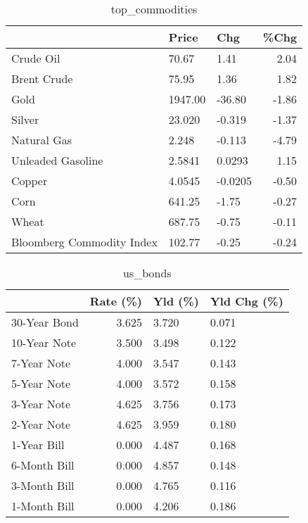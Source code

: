 \documentclass{article}%
\begin{document}
\begin{table}[htbp]%
\caption{top\_commodities}%
\centering%
\begin{adjustbox}{width=1\textwidth}%
\begin{tabular}{lllr}
\toprule
                          &   Price &     Chg &  \%Chg \\
\midrule
               Crude Oil  &   70.67 &    1.41 &  2.04 \\
             Brent Crude  &   75.95 &    1.36 &  1.82 \\
                    Gold  & 1947.00 &  -36.80 & -1.86 \\
                  Silver  &  23.020 &  -0.319 & -1.37 \\
             Natural Gas  &   2.248 &  -0.113 & -4.79 \\
       Unleaded Gasoline  &  2.5841 &  0.0293 &  1.15 \\
                  Copper  &  4.0545 & -0.0205 & -0.50 \\
                    Corn  &  641.25 &   -1.75 & -0.27 \\
                   Wheat  &  687.75 &   -0.75 & -0.11 \\
Bloomberg Commodity Index &  102.77 &   -0.25 & -0.24 \\
\bottomrule
\end{tabular}
%
\end{adjustbox}%
\end{table}

%


\begin{table}[htbp]%
\caption{us\_bonds}%
\centering%
\begin{adjustbox}{width=1\textwidth}%
\begin{tabular}{lrll}
\toprule
             &  Rate (\%) & Yld (\%) & Yld Chg (\%) \\
\midrule
30-Year Bond &     3.625 &   3.720 &       0.071 \\
10-Year Note &     3.500 &   3.498 &       0.122 \\
 7-Year Note &     4.000 &   3.547 &       0.143 \\
 5-Year Note &     4.000 &   3.572 &       0.158 \\
 3-Year Note &     4.625 &   3.756 &       0.173 \\
 2-Year Note &     4.625 &   3.959 &       0.180 \\
 1-Year Bill &     0.000 &   4.487 &       0.168 \\
6-Month Bill &     0.000 &   4.857 &       0.148 \\
3-Month Bill &     0.000 &   4.765 &       0.116 \\
1-Month Bill &     0.000 &   4.206 &       0.186 \\
\bottomrule
\end{tabular}
%
\end{adjustbox}%
\end{table}
\end{document}
